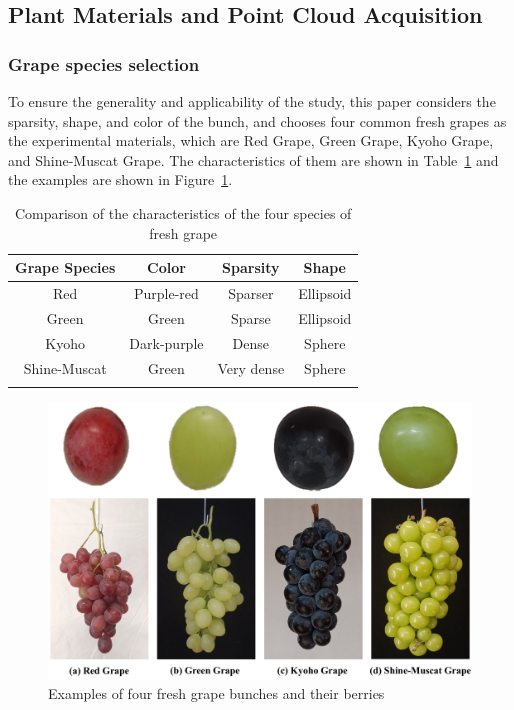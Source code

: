 \documentclass[12pt]{article}
\begin{document}
\subsection{Plant Materials and Point Cloud Acquisition}

\subsubsection{Grape species selection}

To ensure the generality and applicability of the study, this paper considers the sparsity, shape, and color of the bunch, and chooses four common fresh grapes as the experimental materials, which are Red Grape, Green Grape, Kyoho Grape, and Shine-Muscat Grape. 
The characteristics of them are shown in Table~\ref{tlb:1} and the examples are shown in Figure~\ref{fig:raw86}.

\begin{table}[h]
    \centering
    \caption{Comparison of the characteristics of the four species of fresh grape}
    \begin{tabular}{cccc}
        \hline
        \textbf{Grape Species} & \textbf{Color} & \textbf{Sparsity} & \textbf{Shape} \\
        \hline
        Red & Purple-red & Sparser & Ellipsoid \\
        Green & Green & Sparse & Ellipsoid \\
        Kyoho & Dark-purple & Dense & Sphere \\
        Shine-Muscat & Green & Very dense & Sphere \\
        \hline
    \label{tlb:1}
    \end{tabular}
\end{table}

\begin{figure}[hbt!]
    \centering
    \includegraphics[width=1\textwidth]{figures/Figure2.pdf}
    \caption{Examples of four fresh grape bunches and their berries}
    \label{fig:raw86}
\end{figure}
\end{document}
